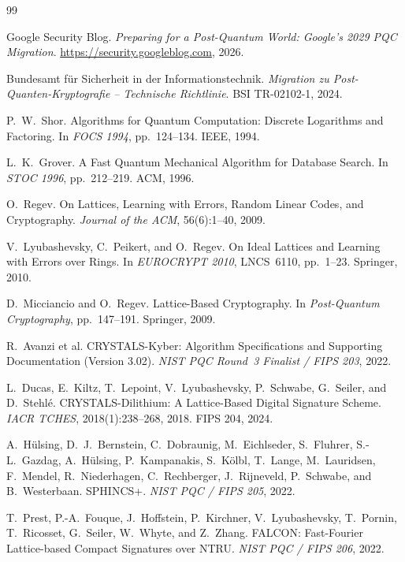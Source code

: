 ﻿\documentclass[a4paper,12pt]{article}
\theoremstyle{definition}
\begin{document}
\begin{thebibliography}{99}

Google Security Blog. \textit{Preparing for a Post-Quantum World: Google's 2029 PQC Migration}. \url{https://security.googleblog.com}, 2026.

Bundesamt f\"ur Sicherheit in der Informationstechnik. \textit{Migration zu Post-Quanten-Kryptografie -- Technische Richtlinie}. BSI TR-02102-1, 2024.

P.\ W.\ Shor. Algorithms for Quantum Computation: Discrete Logarithms and Factoring. In \textit{FOCS 1994}, pp.~124--134. IEEE, 1994.

L.\ K.\ Grover. A Fast Quantum Mechanical Algorithm for Database Search. In \textit{STOC 1996}, pp.~212--219. ACM, 1996.

O.\ Regev. On Lattices, Learning with Errors, Random Linear Codes, and Cryptography. \textit{Journal of the ACM}, 56(6):1--40, 2009.

V.\ Lyubashevsky, C.\ Peikert, and O.\ Regev. On Ideal Lattices and Learning with Errors over Rings. In \textit{EUROCRYPT 2010}, LNCS~6110, pp.~1--23. Springer, 2010.

D.\ Micciancio and O.\ Regev. Lattice-Based Cryptography. In \textit{Post-Quantum Cryptography}, pp.~147--191. Springer, 2009.

R.\ Avanzi et al. CRYSTALS-Kyber: Algorithm Specifications and Supporting Documentation (Version 3.02). \textit{NIST PQC Round~3 Finalist / FIPS 203}, 2022.

L.\ Ducas, E.\ Kiltz, T.\ Lepoint, V.\ Lyubashevsky, P.\ Schwabe, G.\ Seiler, and D.\ Stehl\'e. CRYSTALS-Dilithium: A Lattice-Based Digital Signature Scheme. \textit{IACR TCHES}, 2018(1):238--268, 2018. FIPS 204, 2024.

A.\ H\"ulsing, D.\ J.\ Bernstein, C.\ Dobraunig, M.\ Eichlseder, S.\ Fluhrer, S.-L.\ Gazdag, A.\ Hülsing, P.\ Kampanakis, S.\ Kölbl, T.\ Lange, M.\ Lauridsen, F.\ Mendel, R.\ Niederhagen, C.\ Rechberger, J.\ Rijneveld, P.\ Schwabe, and B.\ Westerbaan. SPHINCS+. \textit{NIST PQC / FIPS 205}, 2022.

T.\ Prest, P.-A.\ Fouque, J.\ Hoffstein, P.\ Kirchner, V.\ Lyubashevsky, T.\ Pornin, T.\ Ricosset, G.\ Seiler, W.\ Whyte, and Z.\ Zhang. FALCON: Fast-Fourier Lattice-based Compact Signatures over NTRU. \textit{NIST PQC / FIPS 206}, 2022.


\end{thebibliography}
\end{document}

